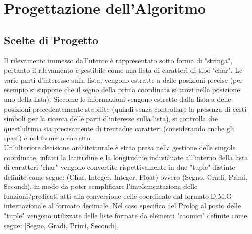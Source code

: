\documentclass{article}
\begin{document}
\section{Progettazione dell'Algoritmo}
\subsection{Scelte di Progetto}
Il rilevamento immesso dall'utente è rappresentato sotto forma di "stringa", pertanto il rilevamento è gestibile come una lista di caratteri di tipo "char". Le varie parti d'interesse sulla lista, vengono estratte a delle posizioni precise (per esempio si suppone che il segno della prima coordinata si trovi nella posizione uno della lista).  Siccome le informazioni vengono estratte dalla lista a delle posizioni precedentemente stabilite (quindi senza controllare la presenza di certi simboli per la ricerca delle parti d'interesse sulla lista), si controlla che quest'ultima sia precisamente di trentadue caratteri (considerando anche gli spazi) e nel formato corretto.\\
Un'ulteriore decisione architetturale è stata presa nella gestione delle singole coordinate, infatti la latitudine e la longitudine individuate all'interno della lista di caratteri "char" vengono convertite rispettivamente in due "tuple" distinte definite come segue: (Char, Integer, Integer, Float) ovvero (Segno, Gradi, Primi, Secondi), in modo da poter semplificare l'implementazione delle funzioni/predicati atti alla conversione delle coordinate dal formato D.M.G internazionale al formato decimale. Nel caso specifico del Prolog al posto delle "tuple" vengono utilizzate delle liste formate da elementi "atomici" definite come segue:  [Segno, Gradi, Primi, Secondi].
 
\end{document}
